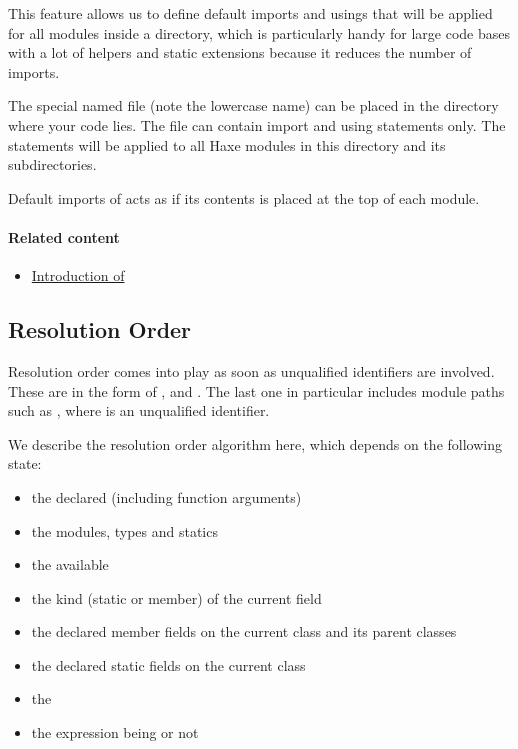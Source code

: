 This feature allows us to define default imports and usings that will be applied for all modules inside a directory, which is particularly handy for large code bases with a lot of helpers and static extensions because it reduces the number of imports.

The special named  file (note the lowercase name) can be placed in the directory where your code lies. The file can contain import and using statements only. The statements will be applied to all Haxe modules in this directory and its subdirectories.

Default imports of  acts as if its contents is placed at the top of each module. 

\paragraph{Related content}
\begin{itemize}
	\item \href{https://haxe.org/blog/importhx-intro/}{Introduction of }
\end{itemize}




\subsection{Resolution Order}
\label{type-system-resolution-order}

Resolution order comes into play as soon as unqualified identifiers are involved. These are  in the form of ,  and . The last one in particular includes module paths such as , where  is an unqualified identifier.  

We describe the resolution order algorithm here, which depends on the following state:

\begin{itemize}
	\item the declared  (including function arguments)
	\item the  modules, types and statics
	\item the available 
	\item the kind (static or member) of the current field
	\item the declared member fields on the current class and its parent classes
	\item the declared static fields on the current class
	\item the 
	\item the expression being  or not
\end{itemize}

